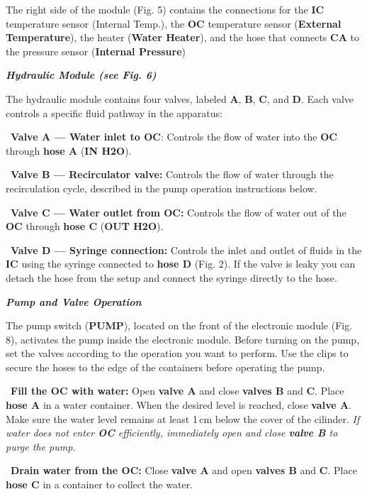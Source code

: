 The right side of the module (Fig. 5) contains the connections for the
\textbf{IC} temperature sensor (Internal Temp.), the \textbf{OC} temperature
sensor (\textbf{External Temperature}), the heater (\textbf{Water Heater}), and
the hose that connects \textbf{CA} to the pressure sensor (\textbf{Internal
Pressure})

\textbf{\textit{Hydraulic Module (see Fig. 6)}}

The hydraulic module contains four valves, labeled \textbf{A}, \textbf{B},
\textbf{C}, and \textbf{D}. Each valve controls a specific fluid pathway in the
apparatus:

\textbullet\ \textbf{Valve A — Water inlet to OC}: Controls the flow of water
into the \textbf{OC} through \textbf{hose A} (\textbf{IN H2O}).

\textbullet\ \textbf{Valve B — Recirculator valve:} Controls the flow of water
through the recirculation cycle, described in the pump operation instructions
below.

\textbullet\ \textbf{Valve C — Water outlet from OC:} Controls the flow of
water out of the \textbf{OC} through \textbf{hose C} (\textbf{OUT H2O}).

\textbullet\ \textbf{Valve D — Syringe connection:} Controls the inlet and
outlet of fluids in the \textbf{IC} using the syringe connected to \textbf{hose
D} (Fig. 2). If the valve is leaky you can detach the hose from the setup and
connect the syringe directly to the hose.

\textbf{\textit{Pump and Valve Operation}}

The pump switch (\textbf{PUMP}), located on the front of the electronic module
(Fig. 8), activates the pump inside the electronic module. Before turning on
the pump, set the valves according to the operation you want to perform. Use
the clips to secure the hoses to the edge of the containers before operating
the pump.

\textbullet\ \textbf{Fill the OC with water:} Open \textbf{valve A} and close
\textbf{valves B} and \textbf{C}. Place \textbf{hose A} in a water container.
When the desired level is reached, close \textbf{valve A}. Make sure the water
level remains at least 1\,cm below the cover of the cilinder. \textit{If water
does not enter \textbf{OC} efficiently, immediately open and close
\textbf{valve B} to purge the pump.}

\textbullet\ \textbf{Drain water from the OC:} Close \textbf{valve A} and open
\textbf{valves B} and \textbf{C}. Place \textbf{hose C} in a container to
collect the water.

